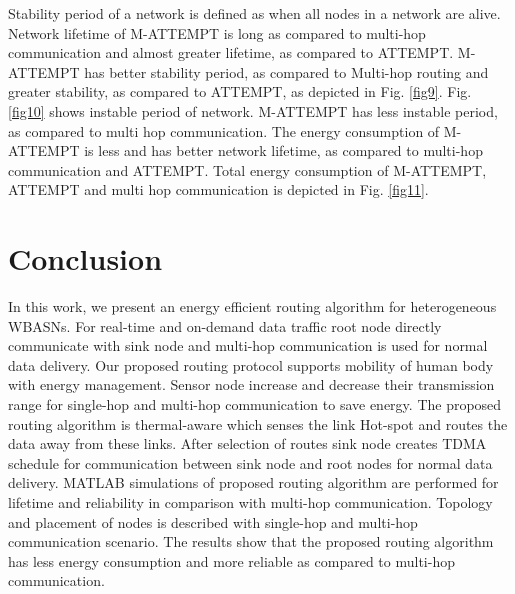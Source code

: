\documentclass[journal]{IEEEtran}
\begin{document}
Stability period of a network is defined as when all nodes in a network are alive. Network lifetime of M-ATTEMPT is  long as compared to multi-hop communication and almost  greater lifetime, as compared to ATTEMPT. M-ATTEMPT has  better stability period, as compared to Multi-hop routing and  greater stability, as compared to ATTEMPT, as depicted in Fig. \ref{fig9}. Fig. \ref{fig10} shows instable period of network. M-ATTEMPT has  less instable period, as compared to multi hop communication. The energy consumption of M-ATTEMPT is less and has better network lifetime, as compared to multi-hop communication and ATTEMPT. Total energy consumption of M-ATTEMPT, ATTEMPT and multi hop communication is depicted in  Fig. \ref{fig11}.

\section{Conclusion}
In this work, we present an energy efficient routing algorithm for heterogeneous WBASNs. For real-time and on-demand data traffic root node directly communicate with sink node and multi-hop communication is used for normal data delivery. Our proposed routing protocol supports mobility of human body with energy management. Sensor node increase and decrease their transmission range for single-hop and multi-hop communication to save energy. The proposed routing algorithm is thermal-aware which senses the link Hot-spot and routes the data away from these links. After selection of routes sink node creates TDMA schedule for communication between sink node and root nodes for normal data delivery. MATLAB simulations of proposed routing algorithm are performed for lifetime and reliability in comparison with multi-hop communication. Topology and placement of nodes is described with single-hop and multi-hop communication scenario. The results show that the proposed routing algorithm has less energy consumption and more reliable as compared to multi-hop communication.




\end{document}

